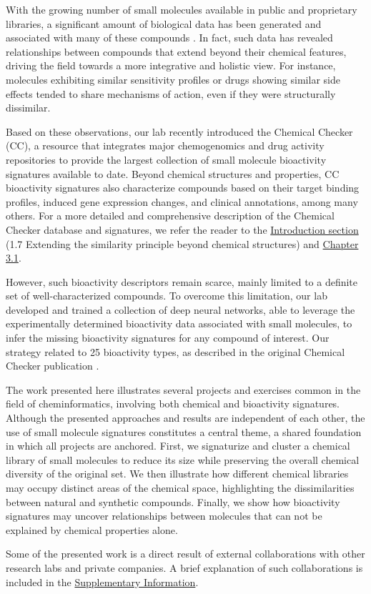 With the growing number of small molecules available in public and proprietary libraries, a significant amount of biological data has been generated and associated with many of these compounds \cite{zdrazil_chembl_2024, kim_pubchem_2023}. In fact, such data has revealed relationships between compounds that extend beyond their chemical features, driving the field towards a more integrative and holistic view. For instance, molecules exhibiting similar sensitivity profiles or drugs showing similar side effects tended to share mechanisms of action, even if they were structurally dissimilar\cite{campillos_drug_2008}.

Based on these observations, our lab recently introduced the Chemical Checker (CC), a resource that integrates major chemogenomics and drug activity repositories to provide the largest collection of small molecule bioactivity signatures available to date. Beyond chemical structures and properties, CC bioactivity signatures also characterize compounds based on their target binding profiles, induced gene expression changes, and clinical annotations, among many others. For a more detailed and comprehensive description of the Chemical Checker database and signatures, we refer the reader to the \hyperref[Introduction_extending]{Introduction section} (1.7 Extending the similarity principle beyond chemical structures) and \hyperref[Chapter_3.1]{Chapter 3.1}. 

However, such bioactivity descriptors remain scarce, mainly limited to a definite set of well-characterized compounds. To overcome this limitation, our lab developed and trained a collection of deep neural networks, able to leverage the experimentally determined bioactivity data associated with small molecules, to infer the missing bioactivity signatures for any compound of interest\cite{bertoni_bioactivity_2021}. Our strategy related to 25 bioactivity types, as described in the original Chemical Checker publication \cite{duran-frigola_extending_2020}.

The work presented here illustrates several projects and exercises common in the field of cheminformatics, involving both chemical and bioactivity signatures. Although the presented approaches and results are independent of each other, the use of small molecule signatures constitutes a central theme, a shared foundation in which all projects are anchored. First, we signaturize and cluster a chemical library of small molecules to reduce its size while preserving the overall chemical diversity of the original set. We then illustrate how different chemical libraries may occupy distinct areas of the chemical space, highlighting the dissimilarities between natural and synthetic compounds. Finally, we show how bioactivity signatures may uncover relationships between molecules that can not be explained by chemical properties alone. 

Some of the presented work is a direct result of external collaborations with other research labs and private companies. A brief explanation of such collaborations is included in the \hyperref[Navigation_SupplementaryInformation]{Supplementary Information}. 




